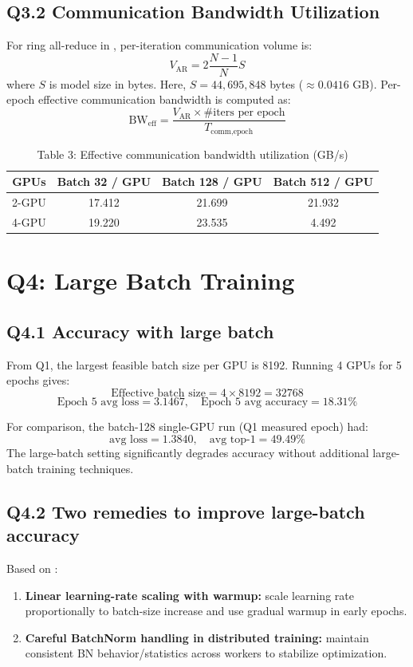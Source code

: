 \documentclass[11pt]{article}
\begin{document}
\subsection*{Q3.2 Communication Bandwidth Utilization}
For ring all-reduce in \cite{patarasuk2009}, per-iteration communication volume is:
\[
V_{\text{AR}} = 2\frac{N-1}{N}S
\]
where $S$ is model size in bytes. Here, $S=44{,}695{,}848$ bytes ($\approx 0.0416$ GB).  
Per-epoch effective communication bandwidth is computed as:
\[
\text{BW}_{\text{eff}}=\frac{V_{\text{AR}}\times \#\text{iters per epoch}}{T_{\text{comm,epoch}}}
\]

\begin{table}[h]
\centering
\caption{Table 3: Effective communication bandwidth utilization (GB/s)}
\label{tab:q3_2}
\begin{tabular}{c|c|c|c}
\toprule
GPUs & Batch 32 / GPU & Batch 128 / GPU & Batch 512 / GPU \\
\midrule
2-GPU & 17.412 & 21.699 & 21.932 \\
4-GPU & 19.220 & 23.535 & 4.492 \\
\bottomrule
\end{tabular}
\end{table}

\section{Q4: Large Batch Training}
\subsection*{Q4.1 Accuracy with large batch}
From Q1, the largest feasible batch size per GPU is 8192.  
Running 4 GPUs for 5 epochs gives:
\[
\text{Effective batch size}=4\times8192=32768
\]
\[
\text{Epoch 5 avg loss}=3.1467,\quad
\text{Epoch 5 avg accuracy}=18.31\%
\]

For comparison, the batch-128 single-GPU run (Q1 measured epoch) had:
\[
\text{avg loss}=1.3840,\quad \text{avg top-1}=49.49\%
\]
The large-batch setting significantly degrades accuracy without additional large-batch training techniques.

\subsection*{Q4.2 Two remedies to improve large-batch accuracy}
Based on \cite{goyal2017}:
\begin{enumerate}
    \item \textbf{Linear learning-rate scaling with warmup:} scale learning rate proportionally to batch-size increase and use gradual warmup in early epochs.
    \item \textbf{Careful BatchNorm handling in distributed training:} maintain consistent BN behavior/statistics across workers to stabilize optimization.
\end{enumerate}
\end{document}
